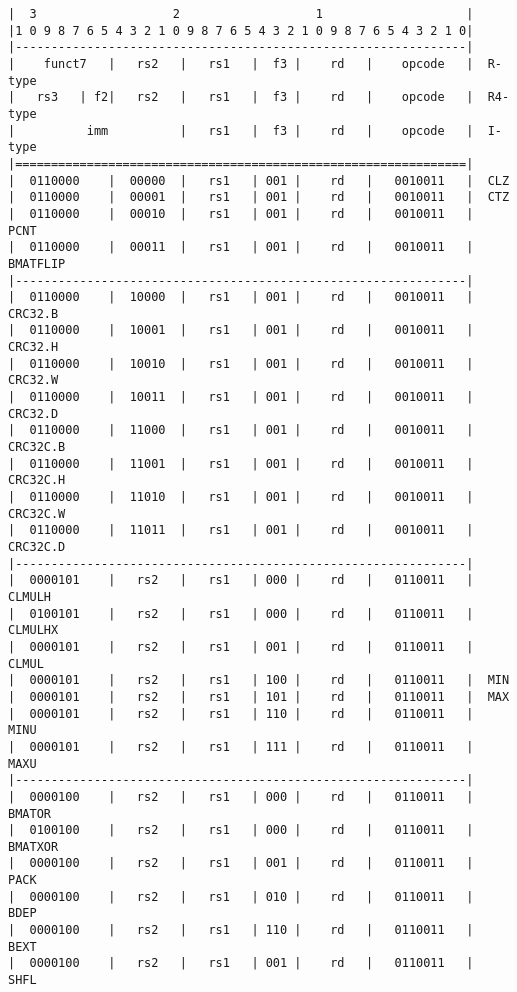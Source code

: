 \begin{minipage}{\linewidth}
\begin{verbatim}
|  3                   2                   1                    |
|1 0 9 8 7 6 5 4 3 2 1 0 9 8 7 6 5 4 3 2 1 0 9 8 7 6 5 4 3 2 1 0|
|---------------------------------------------------------------|
|    funct7   |   rs2   |   rs1   |  f3 |    rd   |    opcode   |  R-type
|   rs3   | f2|   rs2   |   rs1   |  f3 |    rd   |    opcode   |  R4-type
|          imm          |   rs1   |  f3 |    rd   |    opcode   |  I-type
|===============================================================|
|  0110000    |  00000  |   rs1   | 001 |    rd   |   0010011   |  CLZ
|  0110000    |  00001  |   rs1   | 001 |    rd   |   0010011   |  CTZ
|  0110000    |  00010  |   rs1   | 001 |    rd   |   0010011   |  PCNT
|  0110000    |  00011  |   rs1   | 001 |    rd   |   0010011   |  BMATFLIP
|---------------------------------------------------------------|
|  0110000    |  10000  |   rs1   | 001 |    rd   |   0010011   |  CRC32.B
|  0110000    |  10001  |   rs1   | 001 |    rd   |   0010011   |  CRC32.H
|  0110000    |  10010  |   rs1   | 001 |    rd   |   0010011   |  CRC32.W
|  0110000    |  10011  |   rs1   | 001 |    rd   |   0010011   |  CRC32.D
|  0110000    |  11000  |   rs1   | 001 |    rd   |   0010011   |  CRC32C.B
|  0110000    |  11001  |   rs1   | 001 |    rd   |   0010011   |  CRC32C.H
|  0110000    |  11010  |   rs1   | 001 |    rd   |   0010011   |  CRC32C.W
|  0110000    |  11011  |   rs1   | 001 |    rd   |   0010011   |  CRC32C.D
|---------------------------------------------------------------|
|  0000101    |   rs2   |   rs1   | 000 |    rd   |   0110011   |  CLMULH
|  0100101    |   rs2   |   rs1   | 000 |    rd   |   0110011   |  CLMULHX
|  0000101    |   rs2   |   rs1   | 001 |    rd   |   0110011   |  CLMUL
|  0000101    |   rs2   |   rs1   | 100 |    rd   |   0110011   |  MIN
|  0000101    |   rs2   |   rs1   | 101 |    rd   |   0110011   |  MAX
|  0000101    |   rs2   |   rs1   | 110 |    rd   |   0110011   |  MINU
|  0000101    |   rs2   |   rs1   | 111 |    rd   |   0110011   |  MAXU
|---------------------------------------------------------------|
|  0000100    |   rs2   |   rs1   | 000 |    rd   |   0110011   |  BMATOR
|  0100100    |   rs2   |   rs1   | 000 |    rd   |   0110011   |  BMATXOR
|  0000100    |   rs2   |   rs1   | 001 |    rd   |   0110011   |  PACK
|  0000100    |   rs2   |   rs1   | 010 |    rd   |   0110011   |  BDEP
|  0000100    |   rs2   |   rs1   | 110 |    rd   |   0110011   |  BEXT
|  0000100    |   rs2   |   rs1   | 001 |    rd   |   0110011   |  SHFL

\end{verbatim}
\end{minipage}
